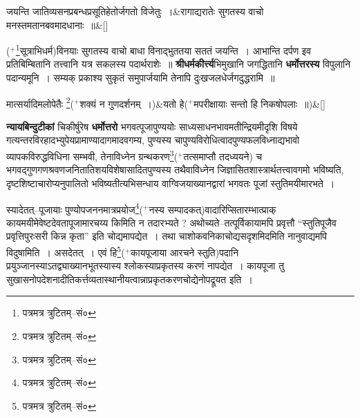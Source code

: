 \documentclass[article,12pt,a4paper]{memoir}
\newcommand{\add}[1]{($^{+}$#1)}
\begin{document}
	  \endgroup
	 
	    
	    \stanza[\smallbreak]
	जयन्ति जातिव्यसनप्रबन्धप्रसूतिहेतोर्जगतो विजेतुः ।&रागाद्यरातेः सुगतस्य वाचो मनस्तमतानबवमादधानाः ॥\&[\smallbreak]


	
	  \endgroup
	

	  \pstart \leavevmode{}\add{\footnote{पत्रमत्र त्रुटितम्--सं०}सूत्राभिधर्म}विनयाः सुगतस्य वाचो बाधा विनाद्भुततया सततं जयन्ति । आभान्ति दर्पण इव प्रतिबिम्बितानि तत्त्वानि यत्र सकलस्य पदार्थराशेः ॥ \textbf{श्रीधर्मकीर्त्त्य}भिमुखानि जगद्धितानि \textbf{धर्मोत्तरस्य} विपुलानि पदान्यमूनि । सम्यक् प्रकाश्य सुकृतं समुपार्जयामि तेनापि दुःखजलधेर्जगदुद्धरामि ॥
	\pend
      
	    
	    \stanza[\smallbreak]
	मात्सर्यादिमलोपेतैः \footnote{पत्रमत्र त्रुटितम्--सं०}\add{शक्यं न गुणदर्शनम् ।}&यतो हे\add{मपरीक्षायाः सन्तो हि निकषोपलाः ॥}\&[\smallbreak]


	

	  \pstart \textbf{न्यायबिन्दुटीकां} चिकीर्षुरेष \textbf{धर्मोत्तरो} भगवत्पूजापुण्ययोः साध्यसाधनभावमतीन्द्रियमीदृशि विषये गत्यन्तरविरहादभ्युपेयप्रामाण्यादागमादवगम्य, पुण्यस्य चापुण्यविरोधित्वादपुण्यफलविध्नाद्यभावो व्यापकविरुद्धविधिना सम्भवी, तेनाविध्नेन ग्रन्थकरण\footnote{पत्रमत्र त्रुटितम्--सं०}\add{तत्समाप्तौ  \leavevmode{} तदध्ययने} च भगवद्गुणगणश्रवणजनितातिशयविशेषासादितपुण्यस्य तथैवाविध्नेन जिज्ञासितशास्त्रार्थतत्त्वावगमो भविष्यति, दृष्टशिष्टाचारोप्यनुपालितो भविष्यतीत्यभिसन्धाय वाग्विजयाख्यानद्वारां भगवतः पूजां स्तुतिमयीमारभते ।
	\pend
      

	  \pstart स्यादेतत्--पूजायाः पुण्योपजननमात्रप्रयोज\footnote{पत्रमत्र त्रुटितम्--सं०}\add{नस्य सम्पादकत्}वादारिप्सितारम्भात्प्राक् कायमयीमेवेष्टदेवतापूजामारचय्य किमिति न तदारभ्यते ? अथोच्यते--तत्पूर्विकायामपि प्रवृत्तौ “स्तुतिपूजैव प्रवृत्तिपुरःसरी किन्न कृता” इति चोद्यमापद्येत । तथा चाशोकवनिकाचोद्यसदृशमिदमिति नानुवाद्यमपि विदुषामिति । असदेतत् । एवं हि\footnote{पत्रमत्र त्रुटितम्--सं०}\add{कायपूजाया आरचने स्तुति}पदानि प्रयुञ्जानस्याऽतद्व्याख्यानभूतस्यास्य श्लोकस्याप्रकृतस्य करणं नापद्येत । कायपूजा तु सुखासनोपदेशनादीतिकर्त्तव्यतास्थानीयत्वान्नाप्रकृतकरणचोद्येनोपद्रूयत इति ।
	\pend
      
\end{document}
